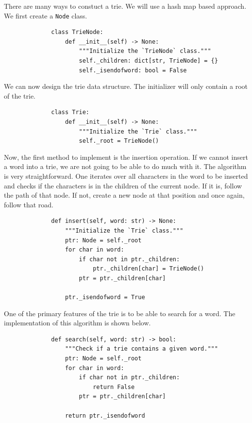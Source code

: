 \documentclass[11pt]{article}
\begin{document}
There are many ways to constuct a trie. We will use a hash map based approach.
We first create a \texttt{Node} class.

\begin{figure}[H]
    \centering
    \begin{verbatim}
        class TrieNode:
            def __init__(self) -> None:
                """Initialize the `TrieNode` class."""
                self._children: dict[str, TrieNode] = {}
                self._isendofword: bool = False
    \end{verbatim}
\end{figure}

We can now design the trie data structure. The initializer will only contain a
root of the trie.

\begin{figure}[H]
    \centering
    \begin{verbatim}
        class Trie:
            def __init__(self) -> None:
                """Initialize the `Trie` class."""
                self._root = TrieNode()
    \end{verbatim}
\end{figure}

Now, the first method to implement is the insertion operation. If we cannot
insert a word into a trie, we are not going to be able to do much with it. The
algorithm is very straightforward. One iterates over all characters in the word
to be inserted and checks if the characters is in the children of the current
node. If it is, follow the path of that node. If not, create a new node at that
position and once again, follow that road.

\begin{figure}[H]
    \centering
    \begin{verbatim}
        def insert(self, word: str) -> None:
            """Initialize the `Trie` class."""
            ptr: Node = self._root
            for char in word:
                if char not in ptr._children:
                    ptr._children[char] = TrieNode()
                ptr = ptr._children[char]

            ptr._isendofword = True
    \end{verbatim}
\end{figure}

One of the primary features of the trie is to be able to search for a word.
The implementation of this algorithm is shown below.

\begin{figure}[H]
    \centering
    \begin{verbatim}
        def search(self, word: str) -> bool:
            """Check if a trie contains a given word."""
            ptr: Node = self._root
            for char in word:
                if char not in ptr._children:
                    return False
                ptr = ptr._children[char]

            return ptr._isendofword
    \end{verbatim}
\end{figure}
\end{document}
